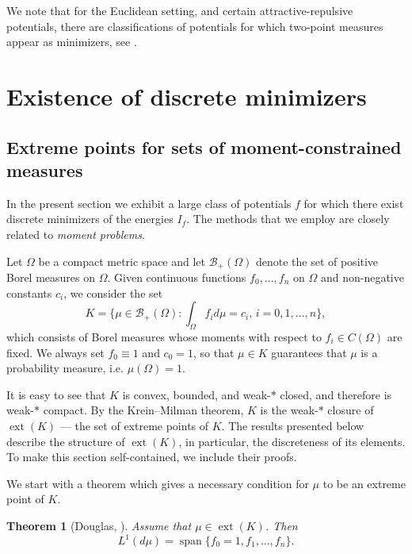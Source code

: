 \documentclass[11pt, leqno]{amsart}
\def\ext{\operatorname{ext}}
\def\sp{\operatorname{span}}
\newtheorem{theorem}{Theorem}[section]
\theoremstyle{definition}
\numberwithin{equation}{section}
\begin{document}
We note that for the Euclidean setting, and certain attractive-repulsive potentials, there are classifications of potentials for which two-point measures appear as minimizers, see \cite{kangkim}.


\section{Existence of discrete minimizers}\label{sec:discrete}

\subsection{Extreme points for sets of moment-constrained measures}
In the present section we exhibit a large class of potentials $f$ for which there exist discrete minimizers of the energies $I_f$. The methods that we employ are closely related to {\em{moment problems}}. 

Let $\Omega$ be a compact metric space and let $\mathcal B_+ (\Omega)$ denote the set of positive Borel measures on $\Omega$.  Given continuous functions $f_0,...,f_n$ on $\Omega$ and non-negative constants $c_i$, we consider the set 
 \begin{equation}\label{eq:defk}
     K = \bigg\{ \mu \in \mathcal B_+(\Omega): \int_\Omega f_i d\mu = c_i, \, i=0,1,\dots,n \bigg\},
 \end{equation}
 which consists of  Borel measures whose moments with respect to $f_i \in C(\Omega)$ are fixed. We always set $f_0 \equiv 1$ and $c_0 =1$, so that $\mu \in K$   guarantees  that $\mu $ is a probability measure, i.e. $\mu (\Omega) =1$.


 It is easy to see that $K$ is convex, bounded, and weak-$*$ closed, and therefore is weak-$*$ compact. By the Krein--Milman theorem, $K$ is the weak-$*$ closure of $\operatorname{ext} (K)$ --- the set of extreme points of $K$. The  results  presented below describe  the structure of  $\operatorname{ext} (K)$, in particular, the discreteness of its elements. To make this section self-contained, we    include their proofs.

 
 We start with a theorem which gives a necessary condition for $\mu$ to be an extreme point of $K$.
 
 \begin{theorem}[Douglas, \cite{douglasExtr1964}]\label{thm:doug}
 Assume that $\mu \in \ext (K)$. Then 
 \begin{equation}
 L^1 (d\mu )  = \sp \{ f_0=1, f_1, \dots, f_n \}. 
 \end{equation}
 \end{theorem}
 
\end{document}
